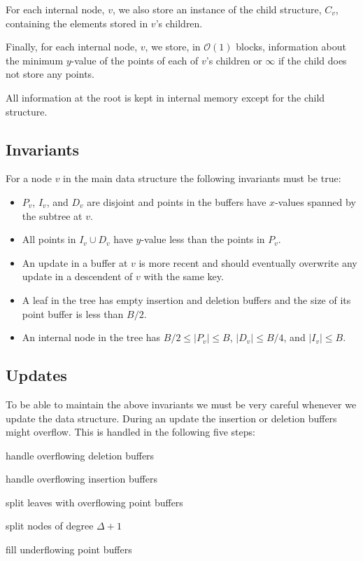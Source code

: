 \documentclass[twoside,11pt,openright]{report}
\begin{document}
For each internal node, $v$, we also store an instance of the child structure, $C_v$, containing the elements stored in $v$'s children.

Finally, for each internal node, $v$, we store, in $\mathcal{O}(1)$ blocks, information about the minimum $y$-value of the points of each of $v$'s children or $\infty$ if the child does not store any points.

All information at the root is kept in internal memory except for the child structure.

\subsection{Invariants}
For a node $v$ in the main data structure the following invariants must be true:
\begin{itemize}
	\item $P_v$, $I_v$, and $D_v$ are disjoint and points in the buffers have $x$-values spanned by the subtree at $v$.
	\item All points in $I_v \cup D_v$ have $y$-value less than the points in $P_v$.
	\item An update in a buffer at $v$ is more recent and should eventually overwrite any update in a descendent of $v$ with the same key.
	\item A leaf in the tree has empty insertion and deletion buffers and the size of its point buffer is less than $B/2$.
	\item An internal node in the tree has $B/2 \leq \vert P_v \vert \leq B$, $\vert D_v \vert \leq B/4$, and $\vert I_v \vert \leq B$.
\end{itemize}

\subsection{Updates}
To be able to maintain the above invariants we must be very careful whenever we update the data structure. During an update the insertion or deletion buffers might overflow. This is handled in the following five steps:
\begin{inlinelist}
	\item handle overflowing deletion buffers
	\item handle overflowing insertion buffers
	\item split leaves with overflowing point buffers
	\item split nodes of degree $\Delta+1$
	\item fill underflowing point buffers
\end{inlinelist}
\end{document}
